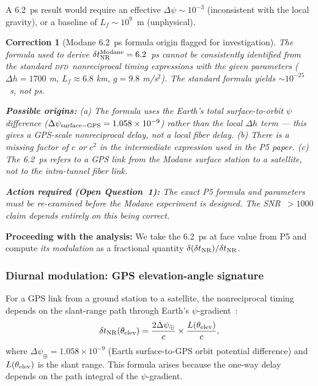 \documentclass[aps,prd,twocolumn,superscriptaddress,nofootinbib,longbibliography]{revtex4-2}
\newcommand{\DFD}{\textsc{dfd}}
\newtheorem{correction}{Correction}
\begin{document}
A 6.2~ps result would require an effective $\Delta\psi\sim10^{-3}$
(inconsistent with the local gravity), or a baseline of $L_f\sim10^9$~m
(unphysical).

\begin{correction}[Modane 6.2~ps formula origin flagged for investigation]
\label{corr:modane}
The formula used to derive $\delta t_{\rm NR}^{\rm Modane} = 6.2$~ps
cannot be consistently identified from the standard \DFD\ nonreciprocal
timing expressions with the given parameters
($\Delta h = 1700$ m, $L_f \approx 6.8$ km, $g = 9.8$ m/s$^2$).
The standard formula yields $\sim 10^{-25}$~s, not ps.

\textbf{Possible origins:}
(a) The formula uses the Earth's total surface-to-orbit $\psi$ difference
($\Delta\psi_{\rm surface-GPS} = 1.058\times10^{-9}$) rather than the
local $\Delta h$ term --- this gives a GPS-scale nonreciprocal delay,
not a local fiber delay.
(b) There is a missing factor of $c$ or $c^2$ in the intermediate
expression used in the P5 paper.
(c) The 6.2~ps refers to a GPS link from the Modane \emph{surface
station} to a satellite, not to the intra-tunnel fiber link.

\textbf{Action required (Open Question~1):} The exact P5 formula and
parameters must be re-examined before the Modane experiment is designed.
The SNR~$>1000$ claim depends entirely on this being correct.
\end{correction}

\textbf{Proceeding with the analysis:} We take the 6.2~ps at face value
from P5 and compute \emph{its modulation} as a fractional quantity
$\delta(\delta t_{\rm NR})/\delta t_{\rm NR}$.

\subsubsection{Diurnal modulation: GPS elevation-angle signature}
\label{sec:diurnal-GPS}

For a GPS link from a ground station to a satellite, the
nonreciprocal timing depends on the slant-range path through
Earth's $\psi$-gradient~\cite{W3i1-P5}:
\begin{equation}\label{eq:NR-GPS}
\delta t_{\rm NR}(\theta_{\rm elev}) = \frac{2\Delta\psi_\oplus}{c}\times\frac{L(\theta_{\rm elev})}{c},
\end{equation}
where $\Delta\psi_\oplus = 1.058\times10^{-9}$ (Earth surface-to-GPS orbit
potential difference) and $L(\theta_{\rm elev})$ is the slant range.
This formula arises because the one-way delay depends on the path
integral of the $\psi$-gradient.
\end{document}
